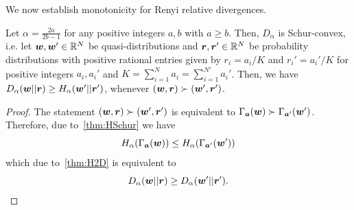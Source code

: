 \documentclass[pra,
aps,
twocolumn,
superscriptaddress,
groupedaddress,
nofootinbib,
reprint
]{revtex4-1}
\begin{document}
We now establish monotonicity for Renyi relative divergences.
\begin{theorem}\label{thm:DSchur}
	Let $\alpha = \frac{2a}{2b-1}$ for any positive integers $a,b$ with $a \geq b$. 
	Then, $D_\alpha$ is Schur-convex, i.e. let $\boldsymbol{w}, \boldsymbol{w}' \in \mathbb{R}^N$ be quasi-distributions and $\boldsymbol{r}, \boldsymbol{r}' \in \mathbb{R}^N$ be probability distributions with positive rational entries given by $r_i = a_i/K$ and $r_i' = a_i'/K$ for positive integers $a_i, a_i'$ and $K = \sum_{i=1}^N a_i = \sum_{i=1}^{N'} a_i'$.
	Then, we have $D_\alpha(\boldsymbol{w} || \boldsymbol{r}) \geq H_\alpha(\boldsymbol{w}' || \boldsymbol{r}')$, whenever $(\boldsymbol{w}, \boldsymbol{r}) \succ (\boldsymbol{w}', \boldsymbol{r}')$.
\end{theorem}
\begin{proof}
	The statement $(\boldsymbol{w}, \boldsymbol{r}) \succ (\boldsymbol{w}', \boldsymbol{r}')$ is equivalent to $\Gamma_{\bm{a}}(\boldsymbol{w}) \succ \Gamma_{\bm{a}'}(\boldsymbol{w}')$.
	Therefore, due to~\cref{thm:HSchur} we have
	\begin{equation}
		H_\alpha(\Gamma_{\bm{a}}(\boldsymbol{w})) \leq H_\alpha(\Gamma_{\bm{a}'}(\boldsymbol{w}'))
	\end{equation}
	which due to~\cref{thm:H2D} is equivalent to
	\begin{equation}
		D_\alpha(\boldsymbol{w} ||\boldsymbol{r}) \geq D_\alpha(\boldsymbol{w}' ||\boldsymbol{r}').
	\end{equation}
\end{proof}
\end{document}
